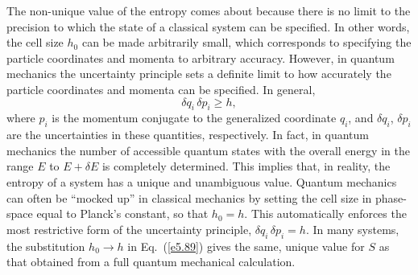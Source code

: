 The non-unique value of the entropy comes about because
there is no limit to the precision to which the state of a classical system can be
specified. In other words, the cell size $h_0$ can be made arbitrarily small, which
corresponds to specifying the particle coordinates and momenta to arbitrary
accuracy. However, in quantum mechanics the uncertainty principle sets a
definite 
limit to how accurately the particle coordinates and momenta can be specified.
In general,
\begin{equation}
\delta q_i\, \delta p_i \geq h,
\end{equation}
where $p_i$ is the momentum conjugate to the generalized coordinate $q_i$,
and $\delta q_i$, $\delta p_i$ are the uncertainties in these quantities, 
respectively. In fact, in quantum mechanics the number of accessible 
quantum states
with the overall energy in the range $E$ to $E+\delta E$ is completely determined.
This implies that, in reality,  the entropy 
of a system has a unique and unambiguous value. Quantum 
mechanics can often be ``mocked up'' in classical mechanics by setting the 
cell size in phase-space equal to Planck's constant, so that $h_0 = h$. This
automatically enforces the most restrictive form of the uncertainty principle,
$\delta q_i\, \delta p_i = h$. In many systems, the
substitution   $h_0 \rightarrow h$ in Eq.~(\ref{e5.89}) gives the same,
unique  value for $S$ as 
that obtained from a full quantum mechanical calculation.

